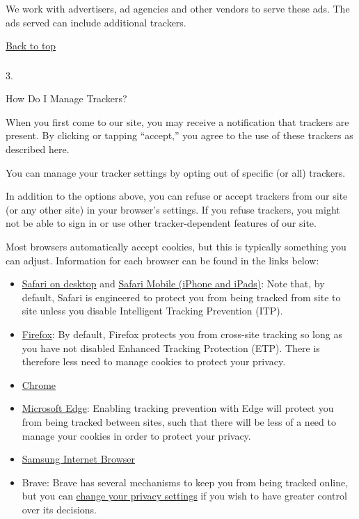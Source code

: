 We work with advertisers, ad agencies and other vendors to serve these
ads. The ads served can include additional trackers.

\href{app}{Back to top}

\hypertarget{-2}{%
\subsubsection{}\label{-2}}

3.

How Do I Manage Trackers?

When you first come to our site, you may receive a notification that
trackers are present. By clicking or tapping ``accept,'' you agree to
the use of these trackers as described here.

You can manage your tracker settings by opting out of specific (or all)
trackers.

In addition to the options above, you can refuse or accept trackers from
our site (or any other site) in your browser's settings. If you refuse
trackers, you might not be able to sign in or use other
tracker-dependent features of our site.

Most browsers automatically accept cookies, but this is typically
something you can adjust. Information for each browser can be found in
the links below:

\begin{itemize}
\item
  \href{https://support.apple.com/guide/safari/manage-cookies-and-website-data-sfri11471/mac}{Safari
  on desktop} and \href{https://support.apple.com/en-us/HT201265}{Safari
  Mobile (iPhone and iPads)}: Note that, by default, Safari is
  engineered to protect you from being tracked from site to site unless
  you disable Intelligent Tracking Prevention (ITP).
\item
  \href{https://support.mozilla.org/en-US/kb/clear-cookies-and-site-data-firefox?redirectlocale=en-US\&redirectslug=delete-cookies-remove-info-websites-stored}{Firefox}:
  By default, Firefox protects you from cross-site tracking so long as
  you have not disabled Enhanced Tracking Protection (ETP). There is
  therefore less need to manage cookies to protect your privacy.
\item
  \href{https://support.google.com/chrome/answer/95647?hl=en}{Chrome}
\item
  \href{https://support.microsoft.com/en-us/help/4468242/microsoft-edge-browsing-data-and-privacy-microsoft-privacy}{Microsoft
  Edge}: Enabling tracking prevention with Edge will protect you from
  being tracked between sites, such that there will be less of a need to
  manage your cookies in order to protect your privacy.
\item
  \href{https://aboutdevice.com/clear-cookies-history-cache-on-samsung-internet-browser-android/}{Samsung
  Internet Browser}
\item
  Brave: Brave has several mechanisms to keep you from being tracked
  online, but you can
  \href{https://support.brave.com/hc/en-us/articles/360017989132-How-do-I-change-my-Privacy-Settings-}{change
  your privacy settings} if you wish to have greater control over its
  decisions.
\end{itemize}

